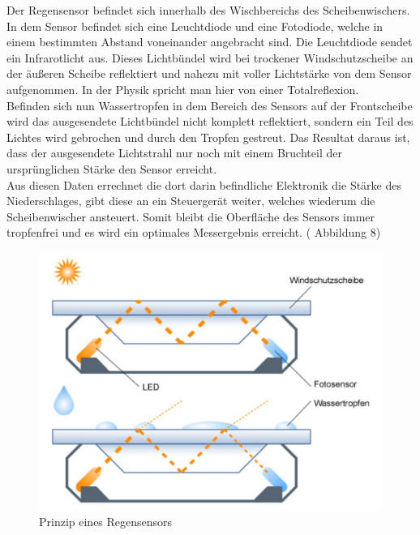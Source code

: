 	                Der Regensensor befindet sich innerhalb des Wischbereichs des Scheibenwischers.                
					In dem Sensor befindet sich eine Leuchtdiode und eine Fotodiode, welche in einem bestimmten Abstand voneinander angebracht sind. Die Leuchtdiode sendet ein Infrarotlicht aus. Dieses Lichtbündel wird bei trockener Windschutzscheibe an der äußeren Scheibe reflektiert und nahezu mit voller Lichtstärke von dem Sensor aufgenommen. In der Physik spricht man hier von einer Totalreflexion.\\
					Befinden sich nun Wassertropfen in dem Bereich des Sensors auf der Frontscheibe wird das ausgesendete Lichtbündel nicht komplett reflektiert, sondern ein Teil des Lichtes wird gebrochen und durch den Tropfen gestreut. Das Resultat daraus ist, dass der ausgesendete Lichtstrahl nur noch mit einem Bruchteil der ursprünglichen Stärke den Sensor erreicht.\\
					Aus diesen Daten errechnet die dort darin befindliche Elektronik die Stärke des Niederschlages, gibt diese an ein Steuergerät weiter, welches wiederum die Scheibenwischer ansteuert. Somit bleibt die Oberfläche des Sensors immer tropfenfrei und es wird ein optimales Messergebnis erreicht. ( Abbildung 8)
					
					\begin{figure}[h]
						\centering
						\includegraphics{regensensor2.jpg}
	                    \caption[archiv.langzeittest.de/volvo-s40/intern/grafik/cb-regensensor-prinzip.jpg] {Prinzip eines Regensensors}
	                    \label{fig:TS06}
	                \end{figure}
	                
